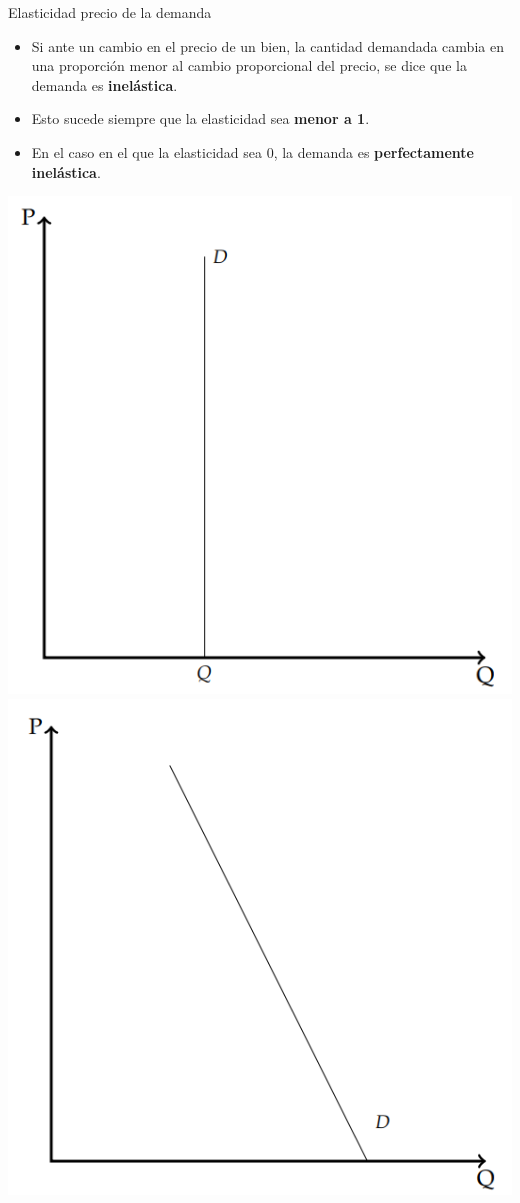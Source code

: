 \documentclass{beamer}
\begin{document}
\begin{frame}{Elasticidad precio de la demanda}
  \begin{itemize}
    \item Si ante un cambio en el precio de un bien, la cantidad
    demandada cambia en una proporción menor al cambio proporcional
    del precio, se dice que la demanda es \textbf{inelástica}.
    \item Esto sucede siempre que la elasticidad sea \textbf{menor a 1}.
    \item En el caso en el que la elasticidad sea 0, la demanda es \textbf{perfectamente inelástica}.
  \end{itemize}
    \centering
  \includegraphics[scale=0.4]{../Figures/C16.1.png}
  \includegraphics[scale=0.4]{../Figures/C16.2.png}
\end{frame}
\end{document}
